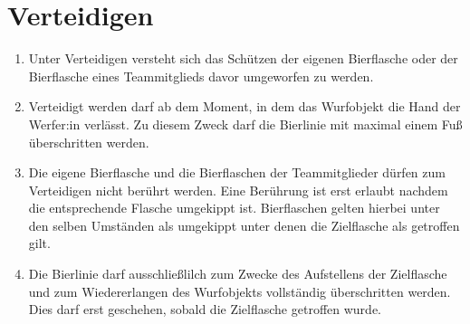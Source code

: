 \section{Verteidigen}
\begin{enumerate}[label={(\arabic*)}]
    \item
    Unter Verteidigen versteht sich das Schützen der eigenen Bierflasche oder der Bierflasche eines Teammitglieds davor umgeworfen zu werden.

    \item
    Verteidigt werden darf ab dem Moment, in dem das Wurfobjekt die Hand der Werfer:in verlässt.
    Zu diesem Zweck darf die Bierlinie mit maximal einem Fuß überschritten werden.

    \item
    Die eigene Bierflasche und die Bierflaschen der Teammitglieder dürfen zum Verteidigen nicht berührt werden.
    Eine Berührung ist erst erlaubt nachdem die entsprechende Flasche umgekippt ist.
    Bierflaschen gelten hierbei unter den selben Umständen als umgekippt unter denen die Zielflasche als getroffen gilt.

    \item
    Die Bierlinie darf ausschließlilch zum Zwecke des Aufstellens der Zielflasche und zum Wiedererlangen des Wurfobjekts vollständig überschritten werden.
    Dies darf erst geschehen, sobald die Zielflasche getroffen wurde.
\end{enumerate}

